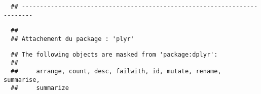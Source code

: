 \documentclass[12pt,twoside]{reedthesis}
\begin{document}
  \begin{verbatim}
  ## -------------------------------------------------------------------------
  \end{verbatim}
  
  \begin{verbatim}
  ## 
  ## Attachement du package : 'plyr'
  \end{verbatim}
  
  \begin{verbatim}
  ## The following objects are masked from 'package:dplyr':
  ## 
  ##     arrange, count, desc, failwith, id, mutate, rename, summarise,
  ##     summarize
  \end{verbatim}
  
  \begin{Shaded}
  \begin{Highlighting}[]
  \StringTok{ } \NormalTok{, } \NormalTok{(}\NormalTok{, }\NormalTok{))}
  

\end{Highlighting}
\end{Shaded}
\end{document}
